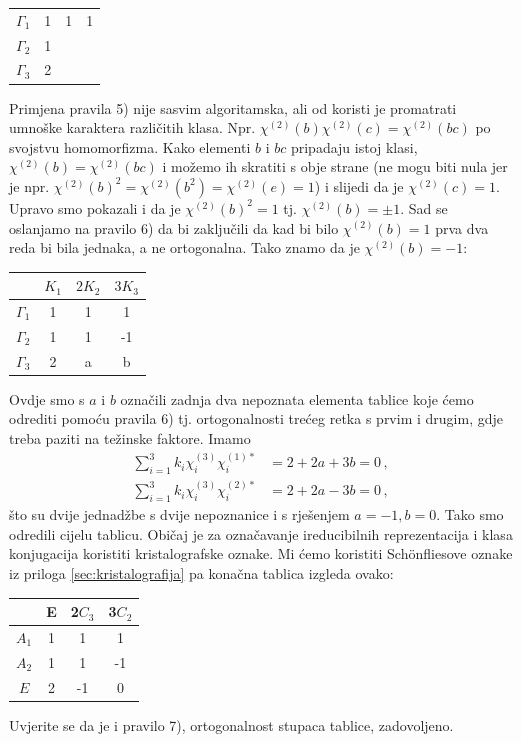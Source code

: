 \begin{primjer}
\begin{center}
\begin{tabular}{c|ccc}
$\Gamma_1$ & 1 & 1 & 1   \\
$\Gamma_2$ & 1 &  &   \\
 $\Gamma_3$  & 2 &  &  
\end{tabular}
\end{center}
Primjena pravila 5) nije sasvim algoritamska, ali od koristi je promatrati
umnoške karaktera različitih klasa. Npr. $\chi^{(2)}(b)\chi^{(2)}(c)=\chi^{(2)}(bc)$
po svojstvu homomorfizma. Kako elementi $b$ i $bc$ pripadaju istoj klasi,
$\chi^{(2)}(b)=\chi^{(2)}(bc)$
i možemo ih skratiti s obje strane (ne mogu biti nula jer je npr. 
$\chi^{(2)}(b)^2 = \chi^{(2)}(b^2) =
\chi^{(2)}(e) = 1$) i slijedi da je $\chi^{(2)}(c)=1$. Upravo smo pokazali i da je 
  $\chi^{(2)}(b)^2=1$ tj. $\chi^{(2)}(b)=\pm 1$.
Sad se oslanjamo na pravilo 6) da bi zaključili da kad bi bilo 
$\chi^{(2)}(b)=1$ prva dva reda bi bila jednaka, a ne
ortogonalna. Tako znamo da je $ \chi^{(2)}(b)=-1$:
\begin{center}
\begin{tabular}{c|ccc}
  & $K_1$ & $2 K_2$  & $ 3 K_3$ \\ \hline
$\Gamma_1$ & 1 & 1 & 1   \\
$\Gamma_2$ & 1 & 1 & -1   \\
 $\Gamma_3$  & 2 & a  & b  
\end{tabular}
\end{center}
Ovdje smo s $a$ i $b$ označili zadnja dva nepoznata elementa tablice koje ćemo
odrediti pomoću pravila 6) tj. ortogonalnosti trećeg retka s prvim i drugim,
gdje treba paziti na težinske faktore. Imamo
\begin{align*}
    \sum_{i=1}^{3} k_{i} \chi^{(3)}_{i} \chi^{(1) *}_{i}& =
      2+2a+3b=0 \,, \\
    \sum_{i=1}^{3} k_{i} \chi^{(3)}_{i} \chi^{(2) *}_{i}& =
      2+2a-3b=0  \,,
\end{align*}
što su dvije jednadžbe s dvije nepoznanice i s rješenjem $a=-1, b=0$.
Tako smo odredili cijelu tablicu. Običaj je za označavanje ireducibilnih
reprezentacija i klasa konjugacija koristiti kristalografske
oznake. Mi ćemo koristiti Sch\"{o}nfliesove oznake iz priloga \ref{sec:kristalografija} 
pa konačna tablica izgleda ovako:

\begin{center}
\begin{tabular}{c|ccc}
  & E & 2$C_3$  & 3$C_2$ \\ \hline
$A_1$ & 1 & 1& 1 \\
$A_2$ & 1 & 1&-1 \\
 $E$  & 2 &-1& 0
\end{tabular}
\end{center}
Uvjerite se da je i pravilo 7), ortogonalnost stupaca tablice, zadovoljeno.
\end{primjer}


